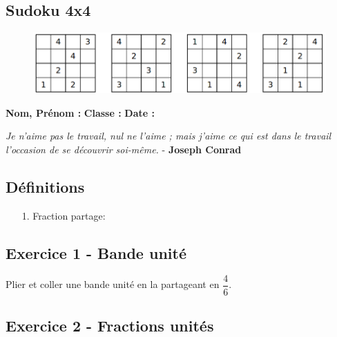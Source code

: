\subsection*{Sudoku 4x4}

\begin{figure}[H]
  \centering
  \includegraphics[width=0.8\linewidth]{6x1-fraction-partage/sudoku-4a.png}
\end{figure}

\newpage

\textbf{Nom, Prénom :} \hspace{8cm} \textbf{Classe :} \hspace{3cm} \textbf{Date :}\\
\vspace{-0.8cm}
\begin{center}
  \textit{Je n'aime pas le travail, nul ne l'aime ; mais j'aime ce qui est dans le travail l'occasion de se découvrir soi-même.}  - \textbf{Joseph Conrad}
\end{center}
\vspace{-0.8cm}

\subsection*{Définitions}
  \begin{enumerate}
    \item[1.] Fraction partage: \dotfill \\
    \Pointilles[1]
  \end{enumerate}

  \vspace{-1cm}

\subsection*{Exercice 1 - Bande unité}

Plier et coller une bande unité en la partageant en $\dfrac{4}{6}$.

\vspace{2cm}

\subsection*{Exercice 2 - Fractions unités}

